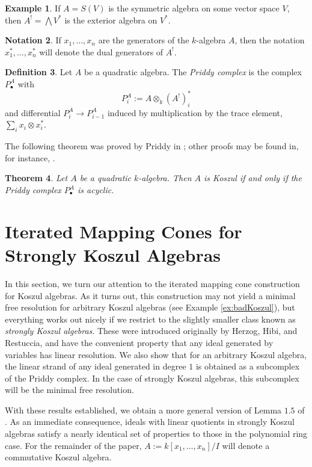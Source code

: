 \documentclass[10pt]{amsart}
\newtheorem{theorem}{Theorem}[section]
\theoremstyle{definition}
\newtheorem{definition}[theorem]{Definition}
\newtheorem{example}[theorem]{Example}
\newtheorem{notation}[theorem]{Notation}
\theoremstyle{remark}
\newtheorem{the context}[theorem]{The Context}
\numberwithin{equation}{theorem}
\numberwithin{equation}{section}
\begin{document}
\begin{example}
If $A = S(V)$ is the symmetric algebra on some vector space $V$, then $A^! = \bigwedge V^*$ is the exterior algebra on $V^*$.
\end{example}

\begin{notation}
If $x_1 , \dots , x_n$ are the generators of the $k$-algebra $A$, then the notation $x_1^*, \dots , x_n^*$ will denote the dual generators of $A^!$. 
\end{notation}

\begin{definition}\label{def:PriddyComplex}
Let $A$ be a quadratic algebra. The \emph{Priddy complex} is the complex $P_\bullet^A$ with
$$P_i^A := A \otimes_k (A^!)_i^*$$
and differential $P_i^A \to P_{i-1}^A$ induced by multiplication by the trace element, $\sum_i x_i \otimes x_i^*$.
\end{definition}

The following theorem was proved by Priddy in \cite{priddy1970koszul}; other proofs may be found in, for instance, \cite{polishchuk2005quadratic}.

\begin{theorem}
Let $A$ be a quadratic $k$-algebra. Then $A$ is Koszul if and only if the Priddy complex $P_\bullet^A$ is acyclic.
\end{theorem}

\section{Iterated Mapping Cones for Strongly Koszul Algebras}\label{sec:itMapCones}

In this section, we turn our attention to the iterated mapping cone construction for Koszul algebras. As it turns out, this construction may not yield a minimal free resolution for arbitrary Koszul algebras (see Example \ref{ex:badKoszul}), but everything works out nicely if we restrict to the slightly smaller class known as \emph{strongly Koszul algebras}. These were introduced originally by Herzog, Hibi, and Restuccia, and have the convenient property that any ideal generated by variables has linear resolution. We also show that for an arbitrary Koszul algebra, the linear strand of any ideal generated in degree $1$ is obtained as a subcomplex of the Priddy complex. In the case of strongly Koszul algebras, this subcomplex will be the minimal free resolution. 

With these results established, we obtain a more general version of Lemma $1.5$ of \cite{herzog2002resolutions}. As an immediate consequence, ideals with linear quotients in strongly Koszul algebras satisfy a nearly identical set of properties to those in the polynomial ring case. For the remainder of the paper, $A := k [ x_1 , \dots , x_n ] / I$ will denote a commutative Koszul algebra.
\end{document}
